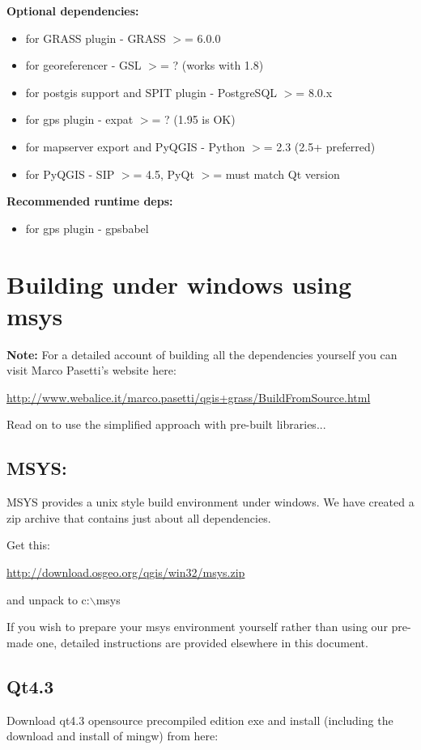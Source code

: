\textbf{Optional dependencies:}
\begin{itemize}
\item for GRASS plugin - GRASS $>$= 6.0.0
\item for georeferencer - GSL $>$= ? (works with 1.8)
\item for postgis support and SPIT plugin - PostgreSQL $>$= 8.0.x
\item for gps plugin - expat $>$= ? (1.95 is OK)
\item for mapserver export and PyQGIS - Python $>$= 2.3 (2.5+ preferred)
\item for PyQGIS - SIP $>$= 4.5, PyQt $>$= must match Qt version
\end{itemize}

\textbf{Recommended runtime deps:}
\begin{itemize}
\item for gps plugin - gpsbabel
\end{itemize}

\section{Building under windows using msys}
\textbf{Note:} For a detailed account of building all the dependencies yourself you 
can visit Marco Pasetti's website here:

\url{http://www.webalice.it/marco.pasetti/qgis+grass/BuildFromSource.html}

Read on to use the simplified approach with pre-built libraries...

\subsection{MSYS:}
MSYS provides a unix style build environment under windows. We have created a
zip archive that contains just about all dependencies.

Get this: 

\url {http://download.osgeo.org/qgis/win32/msys.zip}

and unpack to c:$\backslash$msys

If you wish to prepare your msys environment yourself rather than using 
our pre-made one, detailed instructions are provided elsewhere in this
document.

\subsection{Qt4.3}
Download qt4.3 opensource precompiled edition exe and install (including the
download and install of mingw) from here:

